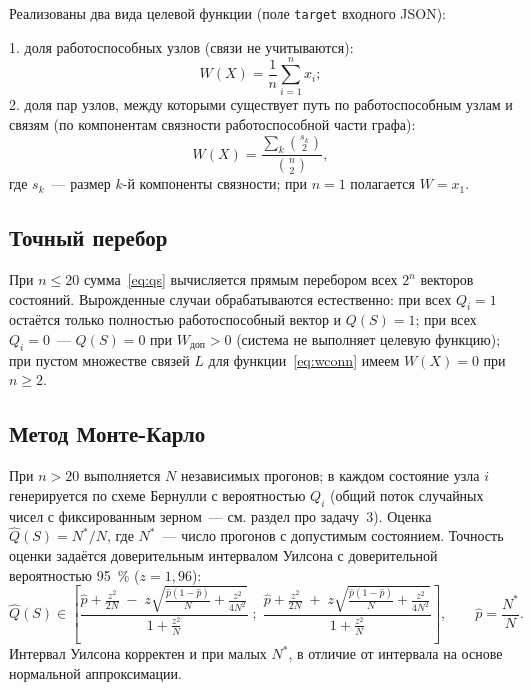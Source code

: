 \documentclass[12pt]{article}
\begin{document}
Реализованы два вида целевой функции (поле \texttt{target} входного JSON):

1. доля работоспособных узлов (связи не учитываются):
\begin{equation}
W(X) = \frac{1}{n} \sum_{i=1}^{n} x_i;
\label{eq:wfraction}
\end{equation}
2. доля пар узлов, между которыми существует путь по работоспособным узлам
и связям (по компонентам связности работоспособной части графа):
\begin{equation}
W(X) = \frac{\sum_k \binom{s_k}{2}}{\binom{n}{2}},
\label{eq:wconn}
\end{equation}
где $s_k$~--- размер $k$-й компоненты связности; при $n = 1$ полагается
$W = x_1$.

\subsection{Точный перебор}

При $n \leq 20$ сумма~\eqref{eq:qs} вычисляется прямым перебором всех
$2^n$ векторов состояний. Вырожденные случаи обрабатываются естественно:
при всех $Q_i = 1$ остаётся только полностью работоспособный вектор и
$Q(S) = 1$; при всех $Q_i = 0$~--- $Q(S) = 0$ при $W_{\text{доп}} > 0$
(система не выполняет целевую функцию); при пустом множестве связей $L$
для функции~\eqref{eq:wconn} имеем $W(X) = 0$ при $n \geq 2$.

\subsection{Метод Монте-Карло}

При $n > 20$ выполняется $N$ независимых прогонов; в каждом состояние узла
$i$ генерируется по схеме Бернулли с вероятностью $Q_i$ (общий поток
случайных чисел с фиксированным зерном~--- см. раздел про задачу~3).
Оценка $\hat{Q}(S) = N^{*} / N$, где $N^{*}$~--- число прогонов с
допустимым состоянием. Точность оценки задаётся доверительным интервалом
Уилсона с доверительной вероятностью 95~\% ($z = 1{,}96$):
\begin{equation}
\hat{Q}(S) \in
\left[
\frac{\hat{p} + \frac{z^2}{2N} \;-\; z\sqrt{\frac{\hat{p}(1-\hat{p})}{N}
+ \frac{z^2}{4N^2}}}{1 + \frac{z^2}{N}}
\;;\;
\frac{\hat{p} + \frac{z^2}{2N} \;+\; z\sqrt{\frac{\hat{p}(1-\hat{p})}{N}
+ \frac{z^2}{4N^2}}}{1 + \frac{z^2}{N}}
\right], \qquad \hat{p} = \frac{N^{*}}{N}.
\label{eq:wilson}
\end{equation}
Интервал Уилсона корректен и при малых $N^{*}$, в отличие от интервала на
основе нормальной аппроксимации.
\end{document}
